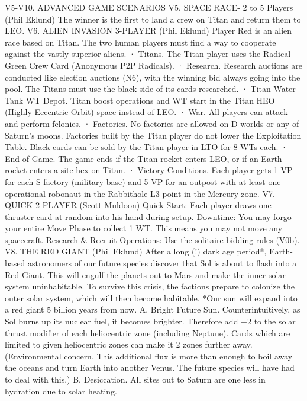 \documentclass[a4paper]{book}
\begin{document}
V5-V10. ADVANCED GAME SCENARIOS
V5. SPACE RACE- 2 to 5 Players (Phil Eklund)
The winner is the first to land a crew on Titan and return them to LEO.
V6. ALIEN INVASION 3-PLAYER (Phil Eklund)
Player Red is an alien race based on Titan. The two human players must find a way to cooperate against the vastly superior aliens.
·       Titans. The Titan player uses the Radical Green Crew Card (Anonymous P2P Radicals).
·       Research. Research auctions are conducted like election auctions (N6), with the winning bid always going into the pool. The Titans must use the black side of its cards researched.
·       Titan Water Tank WT Depot. Titan boost operations and WT start in the Titan HEO (Highly Eccentric Orbit) space instead of LEO.
·       War. All players can attack and perform felonies.
·       Factories. No factories are allowed on D worlds or any of Saturn’s moons. Factories built by the Titan player do not lower the Exploitation Table. Black cards can be sold by the Titan player in LTO for 8 WTs each.
·       End of Game. The game ends if the Titan rocket enters LEO, or if an Earth rocket enters a site hex on Titan.
·       Victory Conditions. Each player gets 1 VP for each S factory (military base) and 5 VP for an outpost with at least one operational robonaut in the Rabbithole L3 point in the Mercury zone.
V7. QUICK 2-PLAYER (Scott Muldoon)
Quick Start: Each player draws one thruster card at random into his hand during setup.
Downtime: You may forgo your entire Move Phase to collect 1 WT. This means you may not move any spacecraft.
Research \& Recruit Operations: Use the solitaire bidding rules (V0b).
V8. THE RED GIANT (Phil Eklund)
After a long (!) dark age period*, Earth-based astronomers of our future species discover that Sol is about to flash into a Red Giant. This will engulf the planets out to Mars and make the inner solar system uninhabitable. To survive this crisis, the factions prepare to colonize the outer solar system, which will then become habitable.
*Our sun will expand into a red giant 5 billion years from now.
A. Bright Future Sun. Counterintuitively, as Sol burns up its nuclear fuel, it becomes brighter. Therefore add +2 to the solar thrust modifier of each heliocentric zone (including Neptune). Cards which are limited to given heliocentric zones can make it 2 zones further away.
(Environmental concern. This additional flux is more than enough to boil away the oceans and turn Earth into another Venus. The future species will have had to deal with this.)
B. Desiccation. All sites out to Saturn are one less in hydration due to solar heating.
\end{document}
